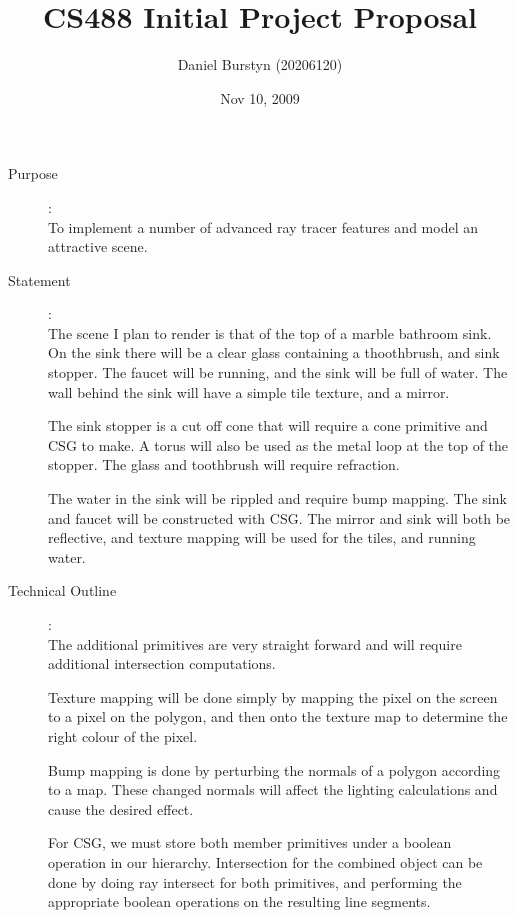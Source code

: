 \documentclass {article}
\title{CS488 Initial Project Proposal}
\author{Daniel Burstyn (20206120)}
\date{Nov 10, 2009}
\begin{document}
\maketitle
\newpage

\begin{description}
\item[Purpose]:\\
	To implement a number of advanced ray tracer features and model an
        attractive scene.

\item[Statement]:\\
        The scene I plan to render is that of the top of a marble bathroom sink.
        On the sink there will be a clear glass containing a thoothbrush, and
        sink stopper.  The faucet will be running, and the sink will be full of
        water.  The wall behind the sink will have a simple tile texture, and a
        mirror.

        The sink stopper is a cut off cone that will require a cone primitive
        and CSG to make.  A torus will also be used as the metal loop at the top
        of the stopper.  The glass and toothbrush will require refraction.

        The water in the sink will be rippled and require bump mapping.  The
        sink and faucet will be constructed with CSG.  The mirror and sink will
        both be reflective, and texture mapping will be used for the tiles, and
        running water.

\item[Technical Outline]:\\
        The additional primitives are very straight forward and will require
        additional intersection computations.

        Texture mapping will be done simply by mapping the pixel on the screen
        to a pixel on the polygon, and then onto the texture map to determine
        the right colour of the pixel.

        Bump mapping is done by perturbing the normals of a polygon according to
        a map.  These changed normals will affect the lighting calculations and
        cause the desired effect.

        For CSG, we must store both member primitives under a boolean operation
        in our hierarchy.  Intersection for the combined object can be done by
        doing ray intersect for both primitives, and performing the appropriate
        boolean operations on the resulting line segments.


\end{description}
\end{document}
